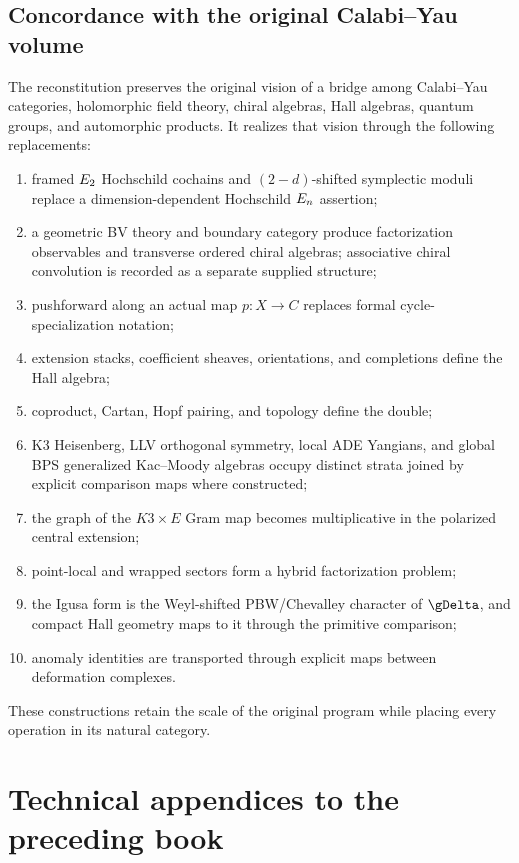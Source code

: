 \chapter{Concordance with the original Calabi--Yau volume}
The reconstitution preserves the original vision of a bridge among Calabi--Yau categories, holomorphic field theory, chiral algebras, Hall algebras, quantum groups, and automorphic products. It realizes that vision through the following replacements:
\begin{enumerate}
\item framed $E_2$ Hochschild cochains and $(2-d)$-shifted symplectic moduli replace a dimension-dependent Hochschild $E_n$ assertion;
\item a geometric BV theory and boundary category produce factorization observables and transverse ordered chiral algebras; associative chiral convolution is recorded as a separate supplied structure;
\item pushforward along an actual map $p:X\to C$ replaces formal cycle-specialization notation;
\item extension stacks, coefficient sheaves, orientations, and completions define the Hall algebra;
\item coproduct, Cartan, Hopf pairing, and topology define the double;
\item K3 Heisenberg, LLV orthogonal symmetry, local ADE Yangians, and global BPS generalized Kac--Moody algebras occupy distinct strata joined by explicit comparison maps where constructed;
\item the graph of the $K3\times E$ Gram map becomes multiplicative in the polarized central extension;
\item point-local and wrapped sectors form a hybrid factorization problem;
\item the Igusa form is the Weyl-shifted PBW/Chevalley character of $\gDelta$, and compact Hall geometry maps to it through the primitive comparison;
\item anomaly identities are transported through explicit maps between deformation complexes.
\end{enumerate}
These constructions retain the scale of the original program while placing every operation in its natural category.

\part{Technical appendices to the preceding book}
